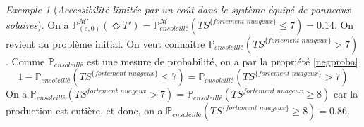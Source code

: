 \documentclass[12pt,a4paper]{report}
\theoremstyle{definition}%
\theoremstyle{remark}
\newtheorem{example}{Exemple}[chapter]
\newcommand{\ie}{i.e., }
\newcommand{\cf}{c.f. }
\newcommand{\pr}{\mathbb{P}}
\begin{document}
\begin{example}[\textit{Accessibilité limitée par un coût dans le système équipé de panneaux solaires}]
On a $\pr^{\mathcal{M'}}_{(e, 0)} (\Diamond T') = \pr^\mathcal{M}_{\textit{ensoleillé}}(TS^{\{ \textit{fortement nuageux} \}} \leq 7) = 0.14$. On revient au problème initial. On veut connaitre $\pr_{\textit{ensoleillé}}(TS^{\{ \textit{fortement nuageux} \}} > 7)$. Comme $\pr_{\textit{ensoleillé}}$ est une mesure de probabilité, on a par la propriété \ref{negproba} \[1 - \pr_{\textit{ensoleillé}}(TS^{\{ \textit{fortement nuageux} \}} \leq 7) = \pr_{\textit{ensoleillé}}(TS^{\{ \textit{fortement nuageux} \}} > 7)\]
On a $\pr_{\textit{ensoleillé}}(TS^{\textit{fortement nuageux}} > 7) =
\pr_{\textit{ensoleillé}}(TS^{\textit{fortement nuageux}} \geq 8)$ car la production est entière,
et donc, on a $\pr_{\textit{ensoleillé}}(TS^{\{ \textit{fortement nuageux} \}} \geq 8) = 0.86$.
\end{example}

%
%
%
\end{document}
